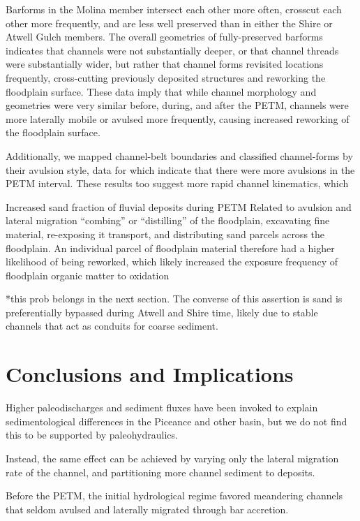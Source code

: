 \documentclass[draft]{compact_proposal}
\begin{document}
Barforms in the Molina member intersect each other more often, crosscut each other more frequently, and are less well preserved than in either the Shire or Atwell Gulch members.
The overall geometries of fully-preserved barforms indicates that channels were not substantially deeper, or that channel threads were substantially wider, but rather that channel forms revisited locations frequently, cross-cutting previously deposited structures and reworking the floodplain surface.
These data imply that while channel morphology and geometries were very similar before, during, and after the PETM, channels were more laterally mobile or avulsed more frequently, causing increased reworking of the floodplain surface.

Additionally, we mapped channel-belt boundaries and classified channel-forms by their avulsion style, data for which indicate that there were more  avulsions in the PETM interval.
These results too suggest more rapid channel kinematics, which 

Increased sand fraction of fluvial deposits during PETM
  Related to avulsion and lateral migration “combing” or “distilling” of the floodplain, excavating fine material, re-exposing it transport, and distributing sand parcels across the floodplain.
  An individual parcel of floodplain material therefore had a higher likelihood of being reworked, which likely increased the exposure frequency of floodplain organic matter to oxidation

*this prob belongs in the next section.
  The converse of this assertion is sand is preferentially bypassed during Atwell and Shire time, likely due to stable channels that act as conduits for coarse sediment.

\section{Conclusions and Implications}


Higher paleodischarges and sediment fluxes have been invoked to explain sedimentological differences in the Piceance and other basin, but we do not find this to be supported by paleohydraulics.

Instead, the same effect can be achieved by varying only the lateral migration rate of the channel, and partitioning more channel sediment to deposits.

Before the PETM, the initial hydrological regime favored meandering channels that seldom avulsed and laterally migrated through bar accretion.
\end{document}
